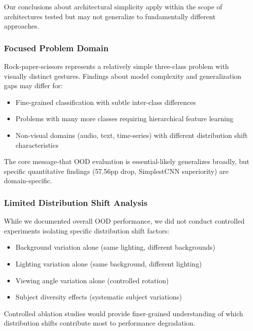 \documentclass[12pt,a4paper]{article}
\begin{document}
Our conclusions about architectural simplicity apply within the scope of architectures tested but may not generalize to fundamentally different approaches.

\subsubsection{Focused Problem Domain}

Rock-paper-scissors represents a relatively simple three-class problem with visually distinct gestures. Findings about model complexity and generalization gaps may differ for:

\begin{itemize}
    \item Fine-grained classification with subtle inter-class differences
    \item Problems with many more classes requiring hierarchical feature learning
    \item Non-visual domains (audio, text, time-series) with different distribution shift characteristics
\end{itemize}

The core message-that OOD evaluation is essential-likely generalizes broadly, but specific quantitative findings (57.56pp drop, SimplestCNN superiority) are domain-specific.

\subsubsection{Limited Distribution Shift Analysis}

While we documented overall OOD performance, we did not conduct controlled experiments isolating specific distribution shift factors:

\begin{itemize}
    \item Background variation alone (same lighting, different backgrounds)
    \item Lighting variation alone (same background, different lighting)
    \item Viewing angle variation alone (controlled rotation)
    \item Subject diversity effects (systematic subject variations)
\end{itemize}

Controlled ablation studies would provide finer-grained understanding of which distribution shifts contribute most to performance degradation.
\end{document}
